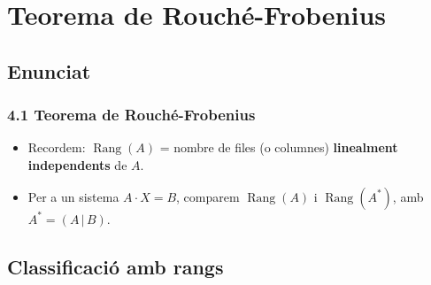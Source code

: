 \documentclass[aspectratio=169]{beamer}
\begin{document}
\section{Teorema de Rouché-Frobenius}
\subsection{Enunciat}

\begin{frame}[t]
  \frametitle{4.1 Teorema de Rouché-Frobenius}

  \vspace{-0.2cm}
  \begin{itemize}
    \item<1-> Recordem: $\operatorname{Rang}(A)$ = nombre de files (o columnes)
      \textbf{linealment independents} de $A$.
    \item<2-> Per a un sistema $A\cdot X = B$, comparem
      $\operatorname{Rang}(A)$ i $\operatorname{Rang}(A^*)$, amb $A^*=(A\,|\,B)$.
  \end{itemize}

  \vspace{0.15cm}

  \vspace{0.12cm}
\end{frame}

\subsection{Classificació amb rangs}
\end{document}
